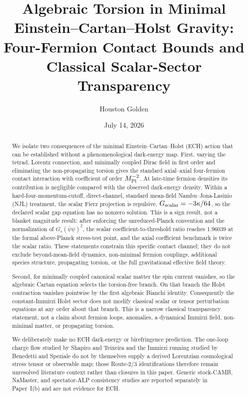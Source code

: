\documentclass[aps,prd,twocolumn,superscriptaddress,showpacs,preprintnumbers,nofootinbib,longbibliography,floatfix]{revtex4-2}
\newcommand{\paperTimestamp}{July 14, 2026}
\begin{document}

\title{Algebraic Torsion in Minimal Einstein--Cartan--Holst Gravity:\\
Four-Fermion Contact Bounds and Classical Scalar-Sector Transparency}

\author{Houston Golden}

\date{\paperTimestamp}

\begin{abstract}
We isolate two consequences of the minimal Einstein--Cartan--Holst (ECH)
action that can be established without a phenomenological dark-energy map.
First, varying the tetrad, Lorentz connection, and minimally coupled Dirac
field in first order and eliminating the non-propagating torsion gives the
standard axial--axial four-fermion contact interaction with coefficient of
order $M_{\rm Pl}^{-2}$.  At late-time fermion densities its contribution is
negligible compared with the observed dark-energy density.  Within a
hard-four-momentum-cutoff, direct-channel, standard mean-field
Nambu--Jona-Lasinio (NJL) treatment, the scalar Fierz projection is repulsive,
$G_{\rm scalar}=-3\kappa/64$, so the declared scalar gap equation has no
nonzero solution.  This is a sign result, not a blanket magnitude result:
after enforcing the unreduced-Planck convention and the normalization of
$G_s(\bar\psi\psi)^2$, the scalar coefficient-to-threshold ratio reaches
$1.96039$ at the formal above-Planck stress-test point, and the axial
coefficient benchmark is twice the scalar ratio.  These statements constrain
this specific contact channel; they do not exclude beyond-mean-field dynamics,
non-minimal fermion couplings, additional species structure, propagating
torsion, or the full gravitational effective field theory.

Second, for minimally coupled canonical scalar matter the spin current
vanishes, so the algebraic Cartan equation selects the torsion-free branch.
On that branch the Holst contraction vanishes pointwise by the first
algebraic Bianchi identity.  Consequently the constant-Immirzi Holst sector
does not modify classical scalar or tensor perturbation equations at any
order about that branch.  This is a narrow classical transparency statement,
not a claim about fermion loops, anomalies, a dynamical Immirzi field,
non-minimal matter, or propagating torsion.

We deliberately make no ECH dark-energy or birefringence prediction.  The
one-loop charge flow studied by Shapiro and Teixeira and the Immirzi running
studied by Benedetti and Speziale do not by themselves supply a derived
Lorentzian cosmological stress tensor or observable map; those Route-2/3
identifications therefore remain unresolved literature context rather than
closures in this paper.  Generic stock-CAMB, NaMaster, and spectator-ALP
consistency studies are reported separately in Paper~I(b) and are not evidence
for ECH.
\end{abstract}
\end{document}
